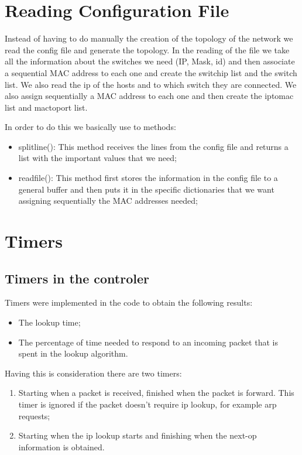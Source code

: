\documentclass[]{report}
\begin{document}
\section{Reading Configuration File}
	Instead of having to do manually the creation of the topology of the network we read the config file and generate the topology. In the reading of the file we take all the information about the switches we need (IP, Mask, id) and then associate a sequential MAC address to each one and create the switch\textunderscore ip list and the switch list. We also read the ip of the hosts and to which switch they are connected. We also assign sequentially a MAC address to each one and then create the ip\textunderscore to\textunderscore mac list and mac\textunderscore to\textunderscore port list.
	
	In order to do this we basically use to methods:
\begin{itemize}
\item split\textunderscore line(): This method receives the lines from the config file and returns a list with the important values that we need;
\item read\textunderscore file(): This method first stores the information in the config file to a general buffer and then puts it in the specific dictionaries that we want assigning sequentially the MAC addresses needed;
\end{itemize}


\section{Timers}
\subsection{Timers in the controler  }

Timers were implemented in the code to obtain the following results:
\begin{itemize}
\item The lookup time;
\item The percentage of time needed to respond to an incoming packet that is spent in the lookup algorithm.
\end{itemize}
Having this is consideration there are two timers:
\begin{enumerate}
\item Starting when a packet is received, finished when the packet is forward. This timer is ignored if the packet doesn’t require ip lookup, for example arp requests;
\item Starting when the ip lookup starts and finishing when the next-op information is obtained.
\end{enumerate}
 
\end{document}
